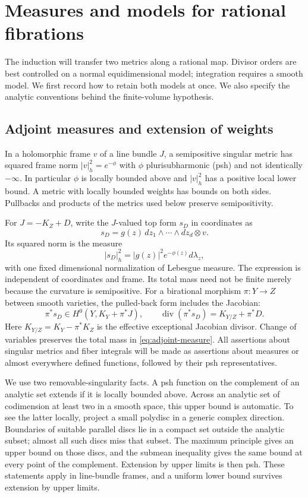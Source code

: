 \section{Measures and models for rational fibrations}
\label{sec:models}

The induction will transfer two metrics along a rational map. Divisor
orders are best controlled on a normal equidimensional model; integration
requires a smooth model. We first record how to retain both models at
once. We also specify the analytic conventions behind the finite-volume
hypothesis.

\subsection{Adjoint measures and extension of weights}

In a holomorphic frame $v$ of a line bundle $J$, a semipositive singular
metric has squared frame norm $|v|^2_h=e^{-\phi}$ with $\phi$
plurisubharmonic (psh) and not identically $-\infty$. In particular
$\phi$ is locally bounded above and $|v|_h^2$ has a positive local
lower bound. A metric with locally bounded weights has bounds on both
sides. Pullbacks and products of the metrics used below preserve
semipositivity.

For $J=-K_Z+D$, write the $J$-valued top form $s_D$ in coordinates as
\[
 s_D=g(z)\,dz_1\wedge\cdots\wedge dz_d\otimes v.
\]
Its squared norm is the measure
\begin{equation}\label{eq:adjoint-measure}
       |s_D|_h^2=|g(z)|^2e^{-\phi(z)}d\lambda_z,
\end{equation}
with one fixed dimensional normalization of Lebesgue measure. The
expression is independent of coordinates and frame. Its total mass
need not be finite merely because the curvature is semipositive.
For a birational morphism $\pi:Y\to Z$ between smooth varieties,
the pulled-back form includes the Jacobian:
\[
 \pi^*s_D\in H^0(Y,K_Y+\pi^*J),\qquad
 \operatorname{div}(\pi^*s_D)=K_{Y/Z}+\pi^*D.
\]
Here $K_{Y/Z}=K_Y-\pi^*K_Z$ is the effective exceptional Jacobian
divisor. Change of variables preserves the total mass in
\eqref{eq:adjoint-measure}. All assertions about singular metrics and
fiber integrals will be made as assertions about measures or almost
everywhere defined functions, followed by their psh representatives.

We use two removable-singularity facts. A psh function on the
complement of an analytic set extends if it is locally bounded above.
Across an analytic set of codimension at least two in a smooth space,
this upper bound is automatic. To see the latter locally, project a
small polydisc in a generic complex direction. Boundaries of suitable
parallel discs lie in a compact set outside the analytic subset; almost
all such discs miss that subset. The maximum principle gives an upper
bound on those discs, and the submean inequality gives the same bound
at every point of the complement. Extension by upper limits is then
psh. These statements apply in line-bundle frames, and a uniform lower
bound survives extension by upper limits.

